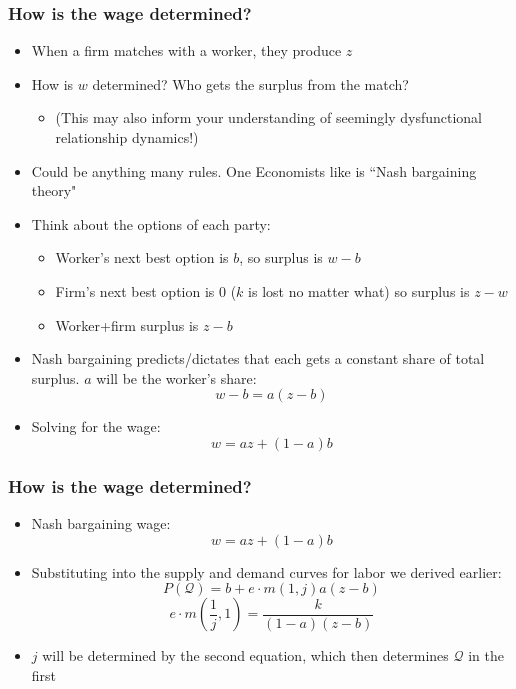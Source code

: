 \documentclass{beamer}
\begin{document}
 
\begin{frame}
\frametitle[alignment=center]{How is the wage determined?}
\begin{itemize}
\item When a firm matches with a worker, they produce $z$
\item How is $w$ determined?  Who gets the surplus from the match?
\begin{itemize}
\item (This may also inform your understanding of seemingly dysfunctional relationship dynamics!) 
\end{itemize}
\item Could be anything many rules.  One Economists like is ``Nash bargaining theory"
\item Think about the options of each party:
\begin{itemize}
\item Worker's next best option is $b$, so surplus is $w-b$
\item Firm's next best option is 0 ($k$ is lost no matter what) so surplus is $z-w$
\item Worker+firm surplus is $z-b$
\end{itemize}
\item Nash bargaining predicts/dictates that each gets a constant share of total surplus.  $a$ will be the worker's share:
$$w-b=a(z-b)$$
\item Solving for the wage:
$$w=az+(1-a)b$$
\end{itemize}
\end{frame}

 
\begin{frame}
\frametitle[alignment=center]{How is the wage determined?}
\begin{itemize}
\item Nash bargaining wage:
$$w=az+(1-a)b$$
\item Substituting into the supply and demand curves for labor we derived earlier:
$$P(\mathcal{Q})=b+e\cdot m(1,j)a(z-b)$$
$$e\cdot m\left(\frac{1}{j},1\right)=\frac{k}{(1-a)(z-b)}$$
\item $j$ will be determined by the second equation, which then determines $\mathcal{Q}$ in the first
\end{itemize}
\end{frame}
\end{document}
